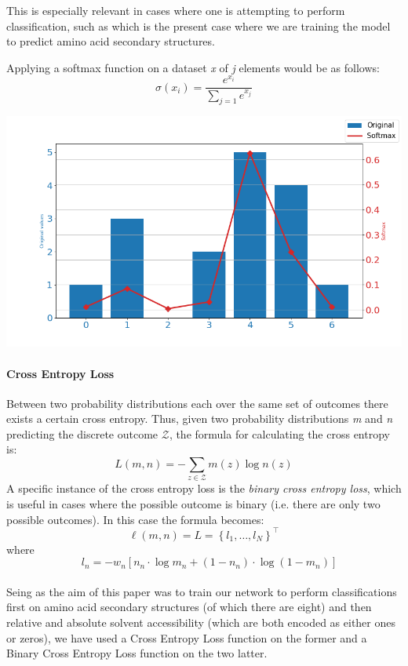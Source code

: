 This is especially relevant in cases where one is attempting to perform classification, such as which is the present case where we are training the model to predict amino acid secondary structures. 

Applying a softmax function on a dataset \textit{x} of \textit{j} elements would be as follows:
$$
\sigma(x_i) = \frac{e^{x_i}}{\sum_{j=1} e^{x_j}}
$$

\begin{Figure}
 \centering
 \includegraphics[width=\linewidth]{../graphs/softmax}
\end{Figure}


\paragraph{Cross Entropy Loss}
Between two probability distributions each over the same set of outcomes there exists a certain cross entropy.
Thus, given two probability distributions \textit{m} and \textit{n} predicting the discrete outcome $\mathcal{Z}$, the formula for calculating the cross entropy is:
$$L ( m , n ) = - \sum _ { z \in \mathcal { Z } } m ( z ) \log n ( z )$$
A specific instance of the cross entropy loss is the \textit{binary cross entropy loss}, which is useful in cases where the possible outcome is binary (i.e. there are only two possible outcomes). In this case the formula becomes:\\
\[
\ell(m, n)=L=\left\{l_{1}, \ldots, l_{N}\right\}^{\top}
\]
where
\[ \quad l_{n}=-w_{n}\left[n_{n} \cdot \log m_{n}+\left(1-n_{n}\right) \cdot \log \left(1-m_{n}\right)\right]
\]
\\
Seing as the aim of this paper was to train our network to perform classifications first on amino acid secondary structures (of which there are eight) and then relative and absolute solvent accessibility (which are both encoded as either ones or zeros), we have used a Cross Entropy Loss function on the former and a Binary Cross Entropy Loss function on the two latter.



